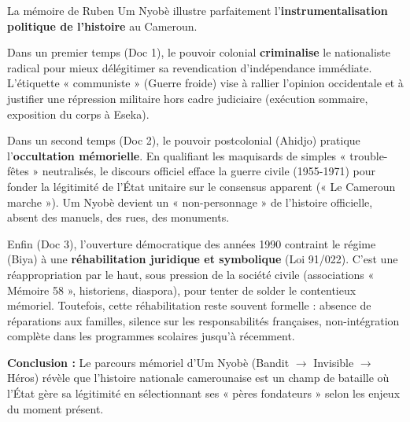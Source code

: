 \documentclass[11pt]{article}
\begin{document}
\begin{exoresolu}
La mémoire de Ruben Um Nyobè illustre parfaitement l'\textbf{instrumentalisation politique de l'histoire} au Cameroun.

Dans un premier temps (Doc 1), le pouvoir colonial \textbf{criminalise} le nationaliste radical pour mieux délégitimer sa revendication d'indépendance immédiate. L'étiquette « communiste » (Guerre froide) vise à rallier l'opinion occidentale et à justifier une répression militaire hors cadre judiciaire (exécution sommaire, exposition du corps à Eseka).

Dans un second temps (Doc 2), le pouvoir postcolonial (Ahidjo) pratique l'\textbf{occultation mémorielle}. En qualifiant les maquisards de simples « trouble-fêtes » neutralisés, le discours officiel efface la guerre civile (1955-1971) pour fonder la légitimité de l'État unitaire sur le consensus apparent (« Le Cameroun marche »). Um Nyobè devient un « non-personnage » de l'histoire officielle, absent des manuels, des rues, des monuments.

Enfin (Doc 3), l'ouverture démocratique des années 1990 contraint le régime (Biya) à une \textbf{réhabilitation juridique et symbolique} (Loi 91/022). C'est une réappropriation par le haut, sous pression de la société civile (associations « Mémoire 58 », historiens, diaspora), pour tenter de solder le contentieux mémoriel. Toutefois, cette réhabilitation reste souvent formelle : absence de réparations aux familles, silence sur les responsabilités françaises, non-intégration complète dans les programmes scolaires jusqu'à récemment.

\textbf{Conclusion :} Le parcours mémoriel d'Um Nyobè (Bandit $\rightarrow$ Invisible $\rightarrow$ Héros) révèle que l'histoire nationale camerounaise est un champ de bataille où l'État gère sa légitimité en sélectionnant ses « pères fondateurs » selon les enjeux du moment présent.
\end{exoresolu}
\end{document}

